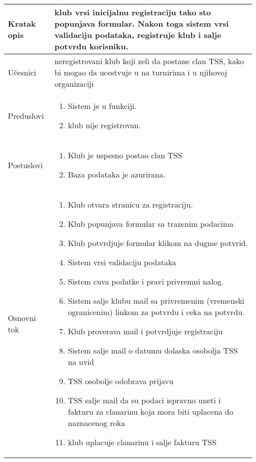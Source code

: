 \documentclass{article}
\begin{document}
\begin{longtable}{| p{} | p{} |} 
\hline
    Kratak opis & klub vrsi inicijalnu registraciju tako sto popunjava formular. Nakon toga sistem vrsi validaciju podataka, 
    registruje klub i salje potvrdu korisniku.\\ 
\hline    
    Učesnici & 
         neregistrovani klub koji zeli da postane clan TSS, kako bi mogao da ucestvuje u na turnirima i u njihovoj organizaciji
    \\
\hline
   Preduslovi & \begin{enumerate}
       \item Sistem je u funkciji.
       \item klub nije registrovan.
   \end{enumerate}\\
\hline  
    Postuslovi & \begin{enumerate}
        \item Klub je uspesno postao clan TSS
        \item Baza podataka je azurirana.
    \end{enumerate}\\
\hline
    Osnovni tok & \begin{enumerate}
        \item Klub otvara stranicu za registraciju.
        \item Klub popunjava formular sa trazenim podacima
        \item Klub potvrdjuje formular klikom na dugme potvrid.
        \item Sistem vrsi validaciju podataka
        \item Sistem cuva podatke i pravi privremni nalog.
        \item Sistem salje klubu mail sa privremenim (vremenski ogranicenim) linkom za potvrdu i ceka na potvrdu.
        \item Klub proverava mail i potvrdjuje registraciju
        \item Sistem salje mail o datumu dolaska osobolja TSS na uvid
        \item TSS osobolje odobrava prijavu
        \item TSS salje mail da su podaci ispravno uneti i fakturu za clanarinu koja mora biti uplacena do naznacenog roka
        \item klub uplacuje clanarinu i salje fakturu TSS

\end{enumerate}
\end{longtable}
\end{document}
